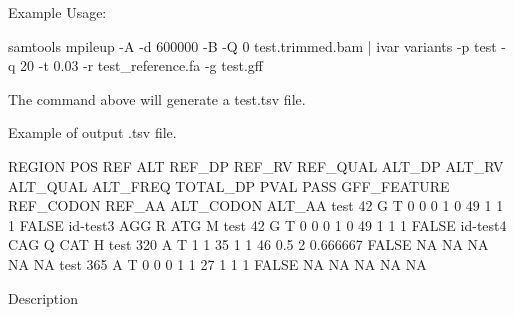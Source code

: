 Example Usage\+: 
\begin{DoxyCode}
samtools mpileup -A -d 600000 -B -Q 0 test.trimmed.bam | ivar variants -p test -q 20 -t 0.03 -r
       test\_reference.fa -g test.gff
\end{DoxyCode}


The command above will generate a test.\+tsv file.

Example of output .tsv file.


\begin{DoxyCode}
REGION  POS REF ALT REF\_DP  REF\_RV  REF\_QUAL    ALT\_DP  ALT\_RV  ALT\_QUAL    ALT\_FREQ    TOTAL\_DP    PVAL   
       PASS    GFF\_FEATURE REF\_CODON   REF\_AA  ALT\_CODON   ALT\_AA
test    42  G   T   0   0   0   1   0   49  1   1   1   FALSE   id-test3    AGG R   ATG M
test    42  G   T   0   0   0   1   0   49  1   1   1   FALSE   id-test4    CAG Q   CAT H
test    320 A   T   1   1   35  1   1   46  0.5 2   0.666667    FALSE   NA  NA  NA  NA  NA
test    365 A   T   0   0   0   1   1   27  1   1   1   FALSE   NA  NA  NA  NA  NA
\end{DoxyCode}


Description

